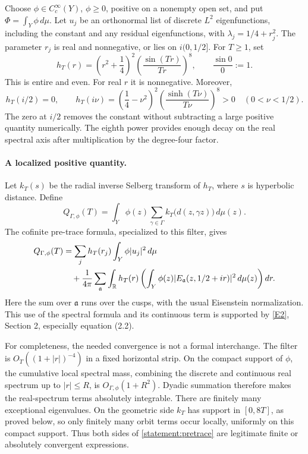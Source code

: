\documentclass[11pt]{article}
\newcommand{\R}{\mathbb{R}}
\newcommand{\eref}[2]{\hyperlink{extra:#1:#2}{[E#2]}}
\begin{document}
Choose $\phi\in C_c^\infty(Y)$, $\phi\ge0$, positive on a nonempty open set,
and put $\Phi=\int_Y\phi\,d\mu$. Let $u_j$ be an orthonormal list of discrete
$L^2$ eigenfunctions, including the constant and any residual eigenfunctions,
with $\lambda_j=1/4+r_j^2$. The parameter $r_j$ is real and nonnegative,
or lies on $i(0,1/2]$. For $T\ge1$, set
\begin{equation}\label{statement:filter}
 h_T(r)=\left(r^2+\frac14\right)^2
          \left(\frac{\sin(Tr)}{Tr}\right)^8,
 \qquad \frac{\sin 0}{0}:=1.
\end{equation}
This is entire and even. For real $r$ it is nonnegative. Moreover,
\begin{equation}\label{statement:exception}
 h_T(i/2)=0,\qquad
 h_T(i\nu)=\left(\frac14-\nu^2\right)^2
             \left(\frac{\sinh(T\nu)}{T\nu}\right)^8>0
       \quad(0<\nu<1/2).
\end{equation}
The zero at $i/2$ removes the constant without subtracting a large positive
quantity numerically. The eighth power provides enough decay on the real
spectral axis after multiplication by the degree-four factor.

\paragraph{A localized positive quantity.}
Let $k_T(s)$ be the radial inverse Selberg transform of $h_T$, where $s$
is hyperbolic distance. Define
\begin{equation}\label{statement:quantity}
 Q_{\Gamma,\phi}(T)=
 \int_Y\phi(z)\sum_{\gamma\in\Gamma}
                k_T\bigl(d(z,\gamma z)\bigr)\,d\mu(z).
\end{equation}
The cofinite pre-trace formula, specialized to this filter, gives
\begin{align}\label{statement:pretrace}
 Q_{\Gamma,\phi}(T)
 &=\sum_j h_T(r_j)\int_Y\phi|u_j|^2\,d\mu \\
 &\quad+\frac1{4\pi}\sum_{\mathfrak a}
   \int_{\R}h_T(r)
      \left(\int_Y\phi(z)
        |E_{\mathfrak a}(z,1/2+ir)|^2\,d\mu(z)\right)dr.\notag
\end{align}
Here the sum over $\mathfrak a$ runs over the cusps, with the usual Eisenstein
normalization. This use of the spectral formula and its continuous term is
supported by \eref{statement}{2}, Section 2, especially equation (2.2).

For completeness, the needed convergence is not a formal interchange.
The filter is $O_T((1+|r|)^{-4})$ in a fixed horizontal strip. On the compact
support of $\phi$, the cumulative local spectral mass, combining the discrete
and continuous real spectrum up to $|r|\le R$, is $O_{\Gamma,\phi}(1+R^2)$.
Dyadic summation therefore makes the real-spectrum terms absolutely
integrable. There are finitely many exceptional eigenvalues. On the geometric
side $k_T$ has support in $[0,8T]$, as proved below, so only finitely many
orbit terms occur locally, uniformly on this compact support. Thus both sides
of \eqref{statement:pretrace} are legitimate finite or absolutely convergent
expressions.
\end{document}
